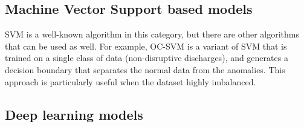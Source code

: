 \subsection{Machine Vector Support based models}

\ac{SVM} is a well-known algorithm in this category, but there are other algorithms that can be used as well. For example, \ac{OC-SVM} is a variant of \ac{SVM} that is trained on a single class of data (non-disruptive discharges), and generates a decision boundary that separates the normal data from the anomalies. This approach is particularly useful when the dataset highly imbalanced.


\subsection{Deep learning models}

